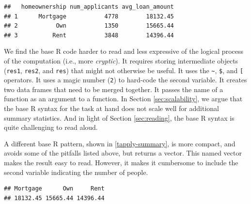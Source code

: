 \documentclass[12pt]{article}
\newenvironment{Shaded}{\begin{snugshade}}{\end{snugshade}}
\newcommand{\AttributeTok}[1]{\textcolor[rgb]{0.77,0.63,0.00}{#1}}
\newcommand{\ConstantTok}[1]{\textcolor[rgb]{0.00,0.00,0.00}{#1}}
\newcommand{\FunctionTok}[1]{\textcolor[rgb]{0.00,0.00,0.00}{#1}}
\newcommand{\NormalTok}[1]{#1}
\newcommand{\SpecialCharTok}[1]{\textcolor[rgb]{0.00,0.00,0.00}{#1}}
\begin{document}
\begin{verbatim}
##   homeownership num_applicants avg_loan_amount
## 1      Mortgage           4778        18132.45
## 2           Own           1350        15665.44
## 3          Rent           3848        14396.44
\end{verbatim}


\label{base-summary} \linespread{2}
\vspace{3mm}\setlength{\parindent}{15pt}

We find the base R code harder to read and less expressive of the
logical process of the computation (i.e., more \emph{cryptic}). It
requires storing intermediate objects (\texttt{res1}, \texttt{res2}, and
\texttt{res}) that might not otherwise be useful. It uses the
\texttt{\textasciitilde{}}, \texttt{\$}, and \texttt{{[}} operators. It
uses a magic number (\texttt{2}) to hard-code the second variable. It
creates two data frames that need to be merged together. It passes the
name of a function as an argument to a function. In Section
\ref{sec:scalability}, we argue that the base R syntax for the task at
hand does not scale well for additional summary statistics. And in light
of Section \ref{sec:reading}, the base R syntax is quite challenging to
read aloud.

A different base R pattern, shown in \ref{tapply-summary}, is more
compact, and avoids some of the pitfalls listed above, but returns a
vector. This named vector makes the result easy to read. However, it
makes it cumbersome to include the second variable indicating the number
of people.

\linespread{1}

\begin{Shaded}
\end{Shaded}

\begin{verbatim}
## Mortgage      Own     Rent 
## 18132.45 15665.44 14396.44
\end{verbatim}
\end{document}
